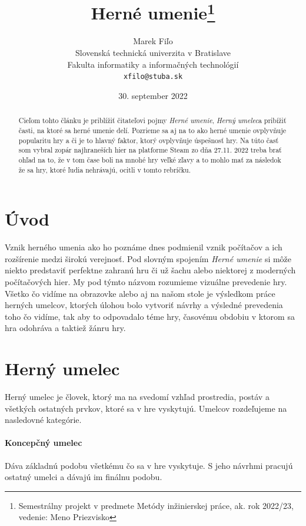 \documentclass[10pt,twoside,slovak,a4paper]{article}
\title{Herné umenie\thanks{Semestrálny projekt v predmete Metódy inžinierskej práce, ak. rok 2022/23, vedenie: Meno Priezvisko}} %
\author{Marek Fiľo\\[2pt]
	{\small Slovenská technická univerzita v Bratislave}\\
	{\small Fakulta informatiky a informačných technológií}\\
	{\small \texttt{xfilo@stuba.sk}}
	}
\date{\small 30. september 2022} %
\begin{document}
\maketitle

\begin{abstract}


Cieľom tohto článku je priblížiť čitateľovi pojmy \emph{Herné umenie}, \emph{Herný umelec}a pribížiť časti, na ktoré sa herné umenie delí. Pozrieme sa aj na to ako herné umenie ovplyvňuje popularitu hry a či je to hlavný faktor, ktorý ovplyvňuje úspešnosť hry. Na túto časť som vybral zopár najhraneších hier na platforme Steam zo dňa 27.11. 2022 treba brať ohľad na to, že v tom čase boli na mnohé hry veľké zľavy a to mohlo mať za následok že sa hry, ktoré ľudia nehrávajú, ocitli v tomto rebríčku.
\end{abstract}




\section{Úvod} \label{začiatok}
Vznik herného umenia ako ho poznáme dnes podmienil vznik počítačov a ich rozšírenie medzi širokú verejnosť.
Pod slovným spojením  \emph{Herné umenie} si môže niekto predstaviť perfektne zahranú hru či už šachu alebo niektorej z moderných počítačových hier. My pod týmto názvom rozumieme vizuálne prevedenie hry. Všetko čo vidíme na obrazovke alebo aj na našom stole je výsledkom práce herných umelcov, ktorých úlohou bolo vytvoriť návrhy a výsledné prevedenia toho čo vidíme, tak aby to odpovadalo téme hry, časovému obdobiu v ktorom sa hra odohráva a taktiež žánru hry.














\section{Herný umelec} \label{pokračovanie}
Herný umelec je človek, ktorý ma na svedomí vzhľad prostredia, postáv a všetkých ostatných prvkov, ktoré sa v hre vyskytujú. Umelcov rozdeľujeme na nasledovné kategórie.
\paragraph{Koncepčný umelec} Dáva základnú podobu všetkému čo sa v hre vyskytuje. S jeho návrhmi pracujú ostatný umelci a dávajú im finálnu podobu.
\cite{kon}
\end{document}
